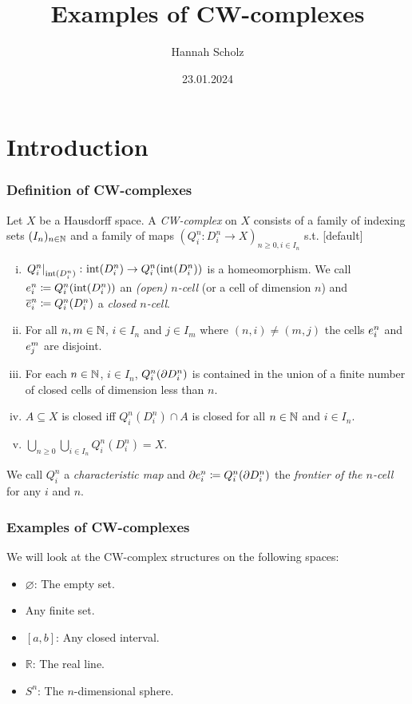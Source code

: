 \documentclass{beamer}
\title{Examples of CW-complexes}
\author{Hannah Scholz}
\institute[MI]{Mathematical Institute of the University of Bonn}
\date{23.01.2024}
\begin{document}
\frame{\titlepage}

\section{Introduction}

\begin{frame}
\frametitle{Definition of CW-complexes}
\fontsize{10pt}{5}\selectfont
  Let $X$ be a Hausdorff space.
    A \emph{CW-complex} on $X$ consists of a family of indexing sets $(I_n)_{n \in \bN}$ and a family of maps $(Q_i^n\colon D_i^n\rightarrow X)_{n \ge 0, i \in I_n}$ s.t.
    [default]
    \begin{enumerate}[(i)]
        \item $\restrict{Q_i^n}{\interior{D_i^n}}\colon \interior{D_i^n} \rightarrow Q_i^n(\interior{D_i^n})$ is a homeomorphism. We call $\openCell{n}{i} \coloneq Q_i^n(\interior{D_i^n})$ an \emph{(open) $n$-cell} (or a cell of dimension $n$)
        and $\closedCell{n}{i} \coloneq Q_i^n(D_i^n)$ a \emph{closed $n$-cell}.
        \item For all $n, m \in \bN$, $i \in I_n$ and $j \in I_m$ where $(n, i) \ne (m, j)$ the cells $\openCell{n}{i}$ and $\openCell{m}{j}$ are disjoint.
        \item For each $n \in \bN$, $i \in I_n$, $Q_i^n(\boundary D_i^n)$ is contained in the union of a finite number of closed cells of dimension less than $n$.
        \item $A \subseteq X$ is closed iff $Q_i^n(D_i^n) \cap A$ is closed for all $n \in \bN$ and $i \in I_n$.
        \item $\bigcup_{n \ge 0}\bigcup_{i \in I_n} Q_i^n(D_i^n) = X$.
    \end{enumerate}
    We call $Q_i^n$ a \emph{characteristic map} and $\cellFrontier{n}{i} \coloneq Q_i^n(\boundary D_i^n)$ the \emph{frontier of the $n$-cell} for any $i$ and $n$.
\end{frame}

\begin{frame}
  \frametitle{Examples of CW-complexes}
  We will look at the CW-complex structures on the following spaces: 
  \begin{itemize}
    \item $\varnothing$: The empty set. 
    \item Any finite set. 
    \item $[a, b]$: Any closed interval.
    \item $\mathbb{R}$: The real line. 
    \item $S^n$: The $n$-dimensional sphere.
  \end{itemize}
\end{frame}
\end{document}
